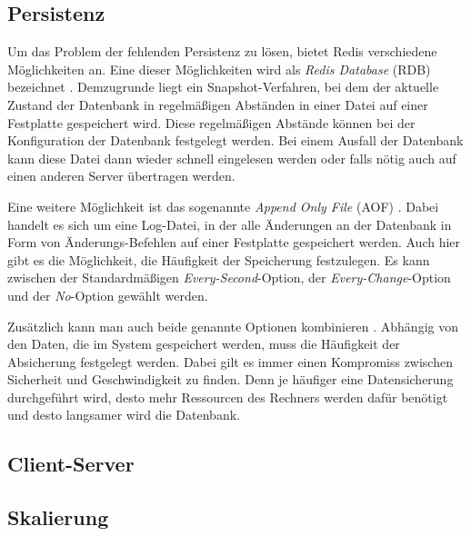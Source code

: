 \subsection{Persistenz}
Um das Problem der fehlenden Persistenz zu lösen, bietet Redis verschiedene Möglichkeiten an.
Eine dieser Möglichkeiten wird als \textit{Redis Database} (RDB) bezeichnet \cite{Redis-Docs-Persistenz}. 
Demzugrunde liegt ein Snapshot-Verfahren, bei dem der aktuelle Zustand der Datenbank in regelmäßigen Abständen in einer Datei auf einer Festplatte gespeichert wird.
Diese regelmäßigen Abstände können bei der Konfiguration der Datenbank festgelegt werden. 
Bei einem Ausfall der Datenbank kann diese Datei dann wieder schnell eingelesen werden oder falls nötig auch auf einen anderen Server übertragen werden.

Eine weitere Möglichkeit ist das sogenannte \textit{Append Only File} (AOF) \cite{Redis-Docs-Persistenz}. 
Dabei handelt es sich um eine Log-Datei, in der alle Änderungen an der Datenbank in Form von Änderungs-Befehlen auf einer Festplatte gespeichert werden.
Auch hier gibt es die Möglichkeit, die Häufigkeit der Speicherung festzulegen. Es kann zwischen der Standardmäßigen \textit{Every-Second}-Option, der \textit{Every-Change}-Option und der \textit{No}-Option gewählt werden.

Zusätzlich kann man auch beide genannte Optionen kombinieren \cite{Redis-Docs-Persistenz}.
Abhängig von den Daten, die im System gespeichert werden, muss die Häufigkeit der Absicherung festgelegt werden.
Dabei gilt es immer einen Kompromiss zwischen Sicherheit und Geschwindigkeit zu finden.
Denn je häufiger eine Datensicherung durchgeführt wird, desto mehr Ressourcen des Rechners werden dafür benötigt und desto langsamer wird die Datenbank.



\subsection{Client-Server}

\subsection{Skalierung}
